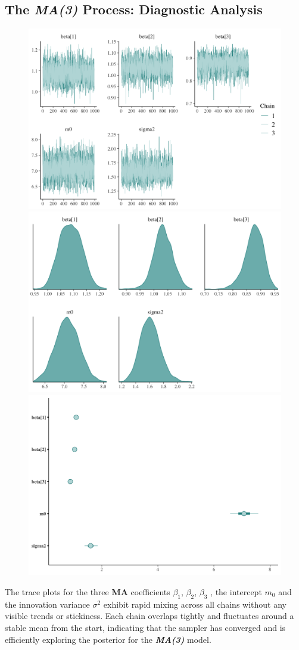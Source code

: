 \documentclass{Configuration_Files/PoliMi3i_thesis}
\begin{document}
\subsection{The \textbf{\textit{MA(3)}} Process: Diagnostic Analysis}
\begin{figure}[H]
    \centering
    \includegraphics[width=0.62\linewidth]{MA(3)_trace.png}
    \vspace{0.5em}
    
    \includegraphics[width=0.62\linewidth]{MA(3)_density.png}
    \vspace{0.5em}
    
    \includegraphics[width=0.62\linewidth]{MA(3)_interval.png}
\end{figure}
\newpage
The trace plots for the three \textbf{\textbf{MA}} coefficients \(\beta_1\), \(\beta_2\),  \(\beta_3\) , the intercept \(m_0\) and the innovation variance \(\sigma^2\) exhibit rapid mixing across all chains without any visible trends or stickiness. Each chain overlaps tightly and fluctuates around a stable mean from the start, indicating that the sampler has converged and is efficiently exploring the posterior for the \textbf{\textit{MA(3)}} model.
\end{document}

